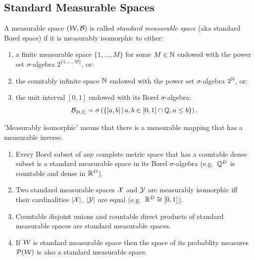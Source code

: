 \subsection{Standard Measurable Spaces}

\begin{Def}
 A measurable space $(\mathcal{W},\mathcal{B})$ is called \emph{standard measurable space} (aka standard Borel space) if it is measurably isomorphic to either:
    \begin{enumerate}
        \item a finite measurable space $\{1,\dots,M\}$ for some $M \in \mathbb{N}$ endowed with the power set $\sigma$-algebra $2^{\{1,\dots,M\}}$, or:
        \item the countably infinite space $\mathbb{N}$ endowed with the power set $\sigma$-algebra $2^{\mathbb{N}}$, or:
        \item the unit interval $[0,1]$ endowed with its Borel $\sigma$-algebra:
           \[\mathcal{B}_{[0,1]} =\sigma\left (\left \{ [a,b]\,|\, a, b \in [0,1] \cap \mathbb{Q}, a \le b \right \} \right ).\]
    \end{enumerate}
    'Measurably isomorphic' means that there is a measurable mapping that has a measurable inverse.
\end{Def}

\begin{Thm}[Kuratowski et al.]
    \begin{enumerate}
        \item Every Borel subset of any complete metric space that has a countable dense subset is a standard measurable space in its Borel $\sigma$-algebra 
    (e.g.\ $\mathbb{Q}^D$ is countable and dense in $\mathbb{R}^D$).
\item Two standard measurable spaces $\mathcal{X}$ and $\mathcal{Y}$ are measurably isomorphic iff their cardinalities $|\mathcal{X}|$, $|\mathcal{Y}|$ are equal 
    (e.g.\ $\mathbb{R}^D \cong [0,1]$).
\item Countable disjoint unions and countable direct products of standard measurable spaces are standard measurable spaces.
\item If $\mathcal{W}$ is standard measurable space then the space of its probablity measures $\mathcal{P}(\mathcal{W})$ is also a standard measurable space.
    \end{enumerate}
\end{Thm}

